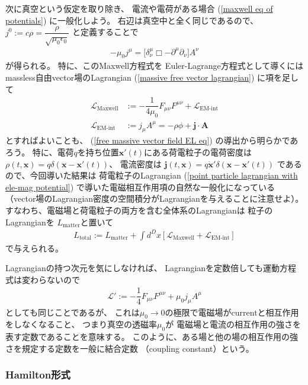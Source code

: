 次に真空という仮定を取り除き、
電流や電荷がある場合
(\ref{maxwell eq of potentials})
に一般化しよう。
右辺は真空中と全く同じであるので、
$j^0 := c \rho
= \dfrac{ \rho }
	{ \sqrt{\mu_0 \epsilon_0} }$
と定義することで
\begin{align}
	- \mu_0 j^\mu
=
    \bigg[
		\delta^\mu_\nu \Box
    - \partial^\mu \partial_\nu
    \bigg] A^\nu
\end{align}
が得られる。
特に、このMaxwell方程式を
Euler-Lagrange方程式として導くには
massless自由vector場のLagrangian
(\ref{massive free vector lagrangian})
に項を足して
\begin{subequations}
\begin{align}
	\mathcal{L}_{\text{Maxwell}}
&:=
	- \dfrac{1}{4 \mu_0}
	F_{\mu\nu} F^{\mu\nu}
	+
	\mathcal{L}_{\text{EM-int}}
\\
	\mathcal{L}_{\text{EM-int}}
&:=
	j_\mu A^\mu
=
	- \rho \phi
	+ \bm{j} \cdot \bm{A}
\label{EM int lagrangian}
\end{align}
\end{subequations}
とすればよいことも、
(\ref{free massive vector field EL eq})
の導出から明らかであろう。
特に、電荷$q$を持ち位置$\bm{x}'(t)$にある荷電粒子の電荷密度は
$\rho(t, \bm{x})
= q \delta(\bm{x} - \bm{x}'(t) )$、
電流密度は
$\bm{j} (t, \bm{x})
= q \dot{\bm{x}}'
\delta (\bm{x} - \bm{x}'(t))$
であるので、今回導いた結果は
荷電粒子のLagrangian
(\ref{point particle lagrangian with ele-mag potential})
で導いた電磁相互作用項の自然な一般化になっている
（vector場のLagrangian密度の空間積分がLagrangianを与えることに注意せよ）。
すなわち、電磁場と荷電粒子の両方を含む全体系のLagrangianは
粒子のLagrangianを
$L_{\text{matter}}$と置いて
\begin{align}
    L_{\text{total}}
:= L_{\text{matter}}
	+ \int d^D x
  \left[
  	\mathcal{L}_{\text{Maxwell}}
	+ \mathcal{L}_{\text{EM-int}}
	\right]
\end{align}
で与えられる。

Lagrangianの持つ次元を気にしなければ、
Lagrangianを定数倍しても運動方程式は変わらないので
\begin{align}
	\mathcal{L}'
:=
	- \dfrac{1}{4}
	F_{\mu\nu} F^{\mu\nu}
	+
	\mu_0 j_\mu A^\mu
\end{align}
としても同じことであるが、
これは$\mu_0 \to 0$の極限で電磁場がcurrentと相互作用をしなくなること、
つまり真空の透磁率$\mu_0$が
電磁場と電流の相互作用の強さを表す定数であることを意味する。
このように、ある場と他の場の相互作用の強さを規定する定数を一般に結合定数
（coupling constant）という。

\subsubsection{Hamilton形式}

